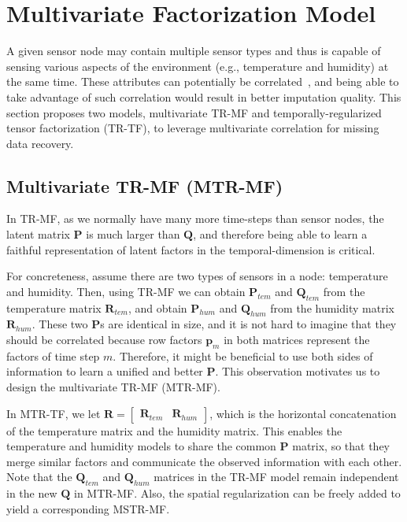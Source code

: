 
\section{Multivariate Factorization Model} \label{sec:tf}
A given sensor node may contain multiple sensor types and thus is capable of sensing various aspects of the environment (e.g., temperature and humidity) at the same time.
These attributes can potentially be correlated~\cite{deshpande2005}, and being able to take advantage of such correlation would result in better imputation quality.
This section proposes two models, multivariate TR-MF and temporally-regularized tensor factorization (TR-TF), to leverage multivariate correlation for missing data recovery.

\subsection{Multivariate TR-MF (MTR-MF)}

In TR-MF, as we normally have many more time-steps than sensor nodes, the latent matrix $\mathbf{P}$ is much larger than $\mathbf{Q}$, and therefore being able to learn a faithful representation of latent factors in the temporal-dimen\-sion is critical. 

For concreteness, assume there are two types of sensors in a node: temperature and humidity.
Then, using TR-MF we can obtain $\mathbf{P}_{tem}$ and $\mathbf{Q}_{tem}$ from the temperature 
matrix $\mathbf{R}_{tem}$, and obtain $\mathbf{P}_{hum}$ and $\mathbf{Q}_{hum}$ from the
humidity matrix $\mathbf{R}_{hum}$.
These two $\mathbf{P}$s are identical in size, and it is not hard to imagine that they should be correlated because row factors $\mathbf{p}_m$ in both matrices represent the factors of time step $m$.
Therefore, it might be beneficial to use both sides of information to learn a unified and better $\mathbf{P}$.
This observation motivates us to design the multivariate TR-MF (MTR-MF).

In MTR-TF, we let 
$\mathbf{R} = \begin{bmatrix}\mathbf{R}_{tem} & \mathbf{R}_{hum} \end{bmatrix}$,
which is the horizontal concatenation of the temperature matrix and the humidity matrix.
This enables the temperature and humidity models to share the common $\mathbf{P}$ matrix, 
so that they merge similar factors and communicate the observed information with each other.
Note that the $\mathbf{Q}_{tem}$ and $\mathbf{Q}_{hum}$ matrices in the TR-MF model remain independent in the new $\mathbf{Q}$ in MTR-MF.
Also, the spatial regularization can be freely added to yield a corresponding MSTR-MF.

